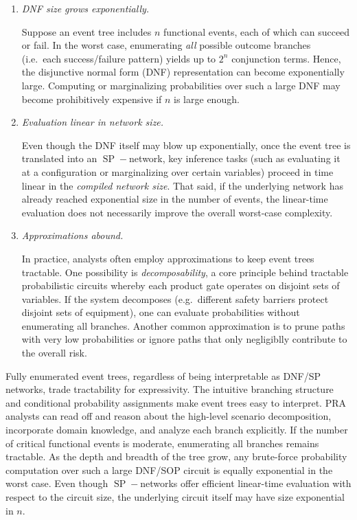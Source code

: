 \begin{enumerate}
    \item \emph{DNF size grows exponentially.}
    
    Suppose an event tree includes \(n\) functional events, each of which can succeed or fail.  In the worst case, enumerating \emph{all} possible outcome branches (i.e.\ each success/failure pattern) yields up to \(2^n\) conjunction terms.  Hence, the disjunctive normal form (DNF) representation can become exponentially large.  Computing or marginalizing probabilities over such a large DNF may become prohibitively expensive if \(n\) is large enough.

    \item \emph{Evaluation linear in network size.}
    
    Even though the DNF itself may blow up exponentially, once the event tree is translated into an \(\operatorname{SP}\!-\)network, key inference tasks (such as evaluating it at a configuration or marginalizing over certain variables) proceed in time linear in the \emph{compiled network size}.  That said, if the underlying network has already reached exponential size in the number of events, the linear-time evaluation does not necessarily improve the overall worst-case complexity.
    
    \item \emph{Approximations abound.}
    
    In practice, analysts often employ approximations to keep event trees tractable.  One possibility is \emph{decomposability}, a core principle behind tractable probabilistic circuits whereby each product gate operates on disjoint sets of variables.  If the system decomposes (e.g.\ different safety barriers protect disjoint sets of equipment), one can evaluate probabilities without enumerating all branches.  Another common approximation is to prune paths with very low probabilities or ignore paths that only negligiblly contribute to the overall risk.
\end{enumerate}

Fully enumerated event trees, regardless of being interpretable as DNF/SP networks, trade tractability for expressivity. The intuitive branching structure and conditional probability assignments make event trees easy to interpret. PRA analysts can read off and reason about the high-level scenario decomposition, incorporate domain knowledge, and analyze each branch explicitly.  If the number of critical functional events is moderate, enumerating all branches remains tractable. As the depth and breadth of the tree grow, any brute-force probability computation over such a large DNF/SOP circuit is equally exponential in the worst case. Even though \(\operatorname{SP}\!-\)networks offer efficient linear-time evaluation with respect to the circuit size, the underlying circuit itself may have size exponential in \(n\).